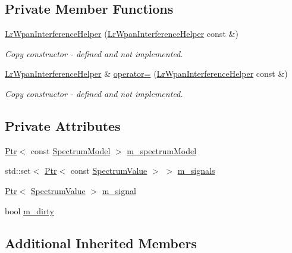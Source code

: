 \subsection*{Private Member Functions}
\begin{DoxyCompactItemize}
\item 
\hyperlink{classns3_1_1LrWpanInterferenceHelper_a03dfb6a6184093fdbae70f7cc591c827}{Lr\+Wpan\+Interference\+Helper} (\hyperlink{classns3_1_1LrWpanInterferenceHelper}{Lr\+Wpan\+Interference\+Helper} const \&)
\begin{DoxyCompactList}\small\item\em Copy constructor -\/ defined and not implemented. \end{DoxyCompactList}\item 
\hyperlink{classns3_1_1LrWpanInterferenceHelper}{Lr\+Wpan\+Interference\+Helper} \& \hyperlink{classns3_1_1LrWpanInterferenceHelper_a819f50bedc1ad613d837f5fa3a563ce5}{operator=} (\hyperlink{classns3_1_1LrWpanInterferenceHelper}{Lr\+Wpan\+Interference\+Helper} const \&)
\begin{DoxyCompactList}\small\item\em Copy constructor -\/ defined and not implemented. \end{DoxyCompactList}\end{DoxyCompactItemize}
\subsection*{Private Attributes}
\begin{DoxyCompactItemize}
\item 
\hyperlink{classns3_1_1Ptr}{Ptr}$<$ const \hyperlink{classns3_1_1SpectrumModel}{Spectrum\+Model} $>$ \hyperlink{classns3_1_1LrWpanInterferenceHelper_a51e9ff732295b1df034bf296864aab38}{m\+\_\+spectrum\+Model}
\item 
std\+::set$<$ \hyperlink{classns3_1_1Ptr}{Ptr}$<$ const \hyperlink{classns3_1_1SpectrumValue}{Spectrum\+Value} $>$ $>$ \hyperlink{classns3_1_1LrWpanInterferenceHelper_a441d09e63473eea61046bb0bb24e3bc7}{m\+\_\+signals}
\item 
\hyperlink{classns3_1_1Ptr}{Ptr}$<$ \hyperlink{classns3_1_1SpectrumValue}{Spectrum\+Value} $>$ \hyperlink{classns3_1_1LrWpanInterferenceHelper_acc5761573937b201a67cd2ca902e1f21}{m\+\_\+signal}
\item 
bool \hyperlink{classns3_1_1LrWpanInterferenceHelper_a8e43b6bfc909ceab15c2ad42afafe324}{m\+\_\+dirty}
\end{DoxyCompactItemize}
\subsection*{Additional Inherited Members}


